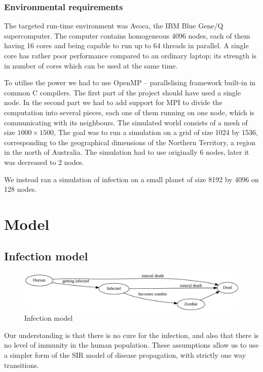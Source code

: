 \documentclass[a4paper]{article}
\begin{document}
\subsubsection{Environmental requirements}

The targeted run-time environment was Avoca\cite{avoca}, the IBM Blue Gene/Q\cite{bluegeneq} supercomputer.
The computer contains homogeneous 4096 nodes, each of them having 16 cores and being capable to run up to 64 threads in parallel.
A single core has rather poor performance compared to an ordinary laptop; its strength is in number of cores which can be used at the same time.

To utilise the power we had to use OpenMP\cite{openmp} -- parallelising framework built-in in common C compilers.
The first part of the project should have used a single node.
In the second part we had to add support for MPI\cite{mpi} to divide the computation into several pieces, each one of them running on one node, which is communicating with its neighbours.
The simulated world consists of a mesh of size $1000 \times 1500$, 
The goal was to run a simulation on a grid of size 1024 by 1536, corresponding to the geographical dimensions of the Northern Territory, a region in the north of Australia\cite{northernterritory}.
The simulation had to use originally 6 nodes, later it was decreased to 2 nodes.

We instead ran a simulation of infection on a small planet of size 8192 by 4096 on 128 nodes.

\section{Model}

\subsection{Infection model}

\begin{figure}[ht]
    \centering
    \includegraphics[width=\textwidth]{model}
    \caption{Infection model}
\end{figure}

Our understanding is that there is no cure for the infection, and also that there is no level of immunity in the human population.
These assumptions allow us to use a simpler form of the SIR model of disease propagation, with strictly one way transitions.
\end{document}
